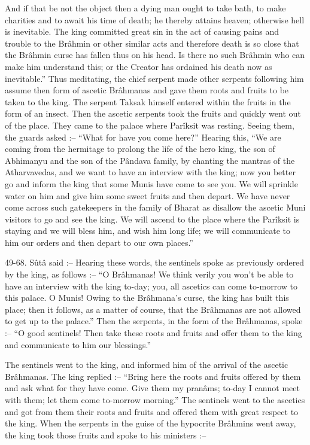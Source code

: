 And if that be not the object then a dying man ought to take bath, to make charities and to await his time of death; he thereby attains heaven; otherwise hell is inevitable. The king committed great sin in the act of causing pains and trouble to the Brâhmin or other similar acts and therefore death is so close that the Brâhmin curse has fallen thus on his head. Is there no such Brâhmin who can make him understand this; or the Creator has ordained his death now as inevitable.” Thus meditating, the chief serpent made other serpents following him assume then form of ascetic Brâhmanas and gave them roots and fruits to be taken to the king. The serpent Taksak himself entered within the fruits in the form of an insect. Then the ascetic serpents took the fruits and quickly went out of the place. They came to the palace where Parîksit was resting. Seeing them, the guards asked :-- “What for have you come here?” Hearing this, “We are coming from the hermitage to prolong the life of the hero king, the son of Abhimanyu and the son of the Pândava family, by chanting the mantras of the Atharvavedas, and we want to have an interview with the king; now you better go and inform the king that some Munis have come to see you. We will sprinkle water on him and give him some sweet fruits and then depart. We have never come across such gatekeepers in the family of Bharat as disallow the ascetic Muni visitors to go and see the king. We will ascend to the place where the Parîksit is staying and we will bless him, and wish him long life; we will communicate to him our orders and then depart to our own places.”

 

49-68. Sûtâ said :-- Hearing these words, the sentinels spoke as previously ordered by the king, as follows :-- “O Brâhmanas! We think verily you won't be able to have an interview with the king to-day; you, all ascetics can come to-morrow to this palace. O Munis! Owing to the Brâhmana's curse, the king has built this place; then it follows, as a matter of course, that the Brâhmanas are not allowed to get up to the palace.” Then the serpents, in the form of the Brâhmanas, spoke :-- “O good sentinels! Then take these roots and fruits and offer them to the king and communicate to him our blessings.”

 

The sentinels went to the king, and informed him of the arrival of the ascetic Brâhmanas. The king replied :-- “Bring here the roots and fruits offered by them and ask what for they have come. Give them my pranâms; to-day I cannot meet with them; let them come to-morrow morning.” The sentinels went to the ascetics and got from them their roots and fruits and offered them with great respect to the king. When the serpents in the guise of the hypocrite Brâhmins went away, the king took those fruits and spoke to his ministers :--

